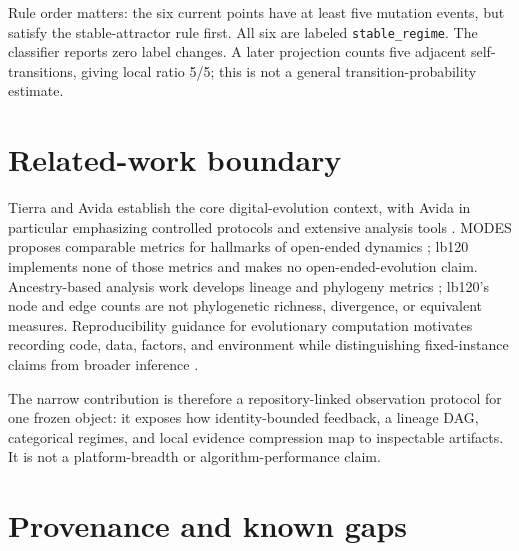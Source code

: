 \documentclass[10pt]{article}
\begin{document}
Rule order matters: the six current points have at least five mutation events,
but satisfy the stable-attractor rule first. All six are labeled
\texttt{stable\_regime}. The classifier reports zero label changes. A later
projection counts five adjacent self-transitions, giving local ratio 5/5; this
is not a general transition-probability estimate.

\section{Related-work boundary}

Tierra and Avida establish the core digital-evolution context, with Avida in
particular emphasizing controlled protocols and extensive analysis tools
\cite{ray1992,ofria2004}. MODES proposes comparable metrics for hallmarks of
open-ended dynamics \cite{dolson2019}; lb120 implements none of those metrics
and makes no open-ended-evolution claim. Ancestry-based analysis work develops
lineage and phylogeny metrics \cite{dolson2020}; lb120's node and edge counts
are not phylogenetic richness, divergence, or equivalent measures.
Reproducibility guidance for evolutionary computation motivates recording
code, data, factors, and environment while distinguishing fixed-instance
claims from broader inference \cite{lopez2021}.

The narrow contribution is therefore a repository-linked observation protocol
for one frozen object: it exposes how identity-bounded feedback, a lineage DAG,
categorical regimes, and local evidence compression map to inspectable
artifacts. It is not a platform-breadth or algorithm-performance claim.

\newpage
\section{Provenance and known gaps}
\end{document}
